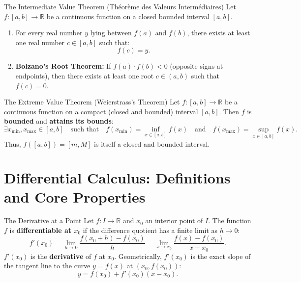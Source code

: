 \begin{theorembox}{The Intermediate Value Theorem (Théorème des Valeurs Intermédiaires)}
Let $f: [a, b] \longrightarrow \mathbb{R}$ be a continuous function on a closed bounded interval $[a, b]$.
\begin{enumerate}[leftmargin=1.4em,itemsep=2pt]
  \item For every real number $y$ lying between $f(a)$ and $f(b)$, there exists at least one real number $c \in [a, b]$ such that:
  \[
  f(c) = y.
  \]
  \item \textbf{Bolzano's Root Theorem:} If $f(a) \cdot f(b) < 0$ (opposite signs at endpoints), then there exists at least one root $c \in (a, b)$ such that $f(c) = 0$.
\end{enumerate}
\end{theorembox}

\begin{theorembox}{The Extreme Value Theorem (Weierstrass's Theorem)}
Let $f: [a, b] \longrightarrow \mathbb{R}$ be a continuous function on a compact (closed and bounded) interval $[a, b]$.
Then $f$ is \textbf{bounded} and \textbf{attains its bounds}:
\begin{equation}
\exists x_{\min}, x_{\max} \in [a, b] \quad \text{such that} \quad f(x_{\min}) = \inf_{x \in [a, b]} f(x) \quad \text{and} \quad f(x_{\max}) = \sup_{x \in [a, b]} f(x).
\end{equation}
Thus, $f([a, b]) = [m, M]$ is itself a closed and bounded interval.
\end{theorembox}

\section{Differential Calculus: Definitions and Core Properties}

\begin{definitionbox}{The Derivative at a Point}
Let $f: I \longrightarrow \mathbb{R}$ and $x_0$ an interior point of $I$.
The function $f$ is \textbf{differentiable at $x_0$} if the difference quotient has a finite limit as $h \to 0$:
\begin{equation}
f'(x_0) = \lim_{h \to 0} \frac{f(x_0 + h) - f(x_0)}{h} = \lim_{x \to x_0} \frac{f(x) - f(x_0)}{x - x_0}.
\end{equation}
$f'(x_0)$ is the \textbf{derivative} of $f$ at $x_0$.
Geometrically, $f'(x_0)$ is the exact slope of the tangent line to the curve $y = f(x)$ at $(x_0, f(x_0))$:
\[
y = f(x_0) + f'(x_0)(x - x_0).
\]
\end{definitionbox}

